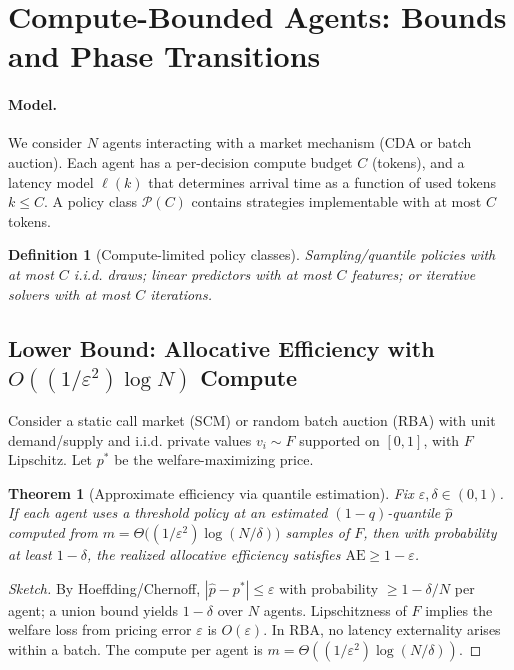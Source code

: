 \documentclass[11pt]{article}
\newtheorem{theorem}{Theorem}
\newtheorem{definition}{Definition}
\begin{document}
\section*{Compute-Bounded Agents: Bounds and Phase Transitions}

\paragraph{Model.} We consider $N$ agents interacting with a market mechanism (CDA or batch auction). Each agent has a per-decision compute budget $C$ (tokens), and a latency model $\ell(k)$ that determines arrival time as a function of used tokens $k\le C$. A policy class $\mathcal{P}(C)$ contains strategies implementable with at most $C$ tokens.

\begin{definition}[Compute-limited policy classes]
Sampling/quantile policies with at most $C$ i.i.d. draws; linear predictors with at most $C$ features; or iterative solvers with at most $C$ iterations.
\end{definition}

\subsection*{Lower Bound: Allocative Efficiency with $O((1/\varepsilon^2)\log N)$ Compute}

Consider a static call market (SCM) or random batch auction (RBA) with unit demand/supply and i.i.d. private values $v_i\sim F$ supported on $[0,1]$, with $F$ Lipschitz. Let $p^*$ be the welfare-maximizing price.

\begin{theorem}[Approximate efficiency via quantile estimation]
Fix $\varepsilon,\delta\in(0,1)$. If each agent uses a threshold policy at an estimated $(1-q)$-quantile $\hat p$ computed from $m=\Theta\big((1/\varepsilon^2)\log(N/\delta)\big)$ samples of $F$, then with probability at least $1-\delta$, the realized allocative efficiency satisfies $\mathrm{AE}\ge 1-\varepsilon$.
\end{theorem}

\begin{proof}[Sketch]
By Hoeffding/Chernoff, $|\hat p-p^*|\le \varepsilon$ with probability $\ge 1-\delta/N$ per agent; a union bound yields $1-\delta$ over $N$ agents. Lipschitzness of $F$ implies the welfare loss from pricing error $\varepsilon$ is $O(\varepsilon)$. In RBA, no latency externality arises within a batch. The compute per agent is $m=\Theta((1/\varepsilon^2)\log(N/\delta))$.
\end{proof}
\end{document}
